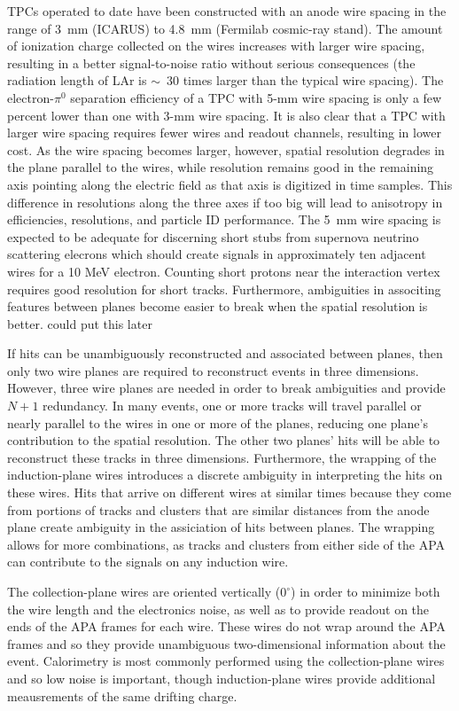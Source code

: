 TPCs operated to date have been constructed with an anode wire spacing
in the range of 3~mm (ICARUS) to 4.8~mm (Fermilab cosmic-ray
stand). The amount of ionization charge collected on the wires
increases with larger wire spacing, resulting in a better
signal-to-noise ratio without serious consequences (the radiation
length of LAr is $\sim$~30 times larger than the typical wire
spacing). The electron-$\pi^0$ separation efficiency of a TPC with
5-mm wire spacing is only a few percent lower than one with 3-mm wire
spacing. It is also clear that a TPC with larger wire spacing requires
fewer wires and readout channels, resulting in lower cost.  As the
wire spacing becomes larger, however, spatial resolution degrades in
the plane parallel to the wires, while resolution remains good in the
remaining axis pointing along the electric field as that axis is
digitized in time samples.  This difference in resolutions along the
three axes if too big will lead to anisotropy in efficiencies,
resolutions, and particle ID performance.  The 5~mm wire spacing is
expected to be adequate for discerning short stubs from supernova
neutrino scattering elecrons which should create signals in
approximately ten adjacent wires for a 10 MeV electron.  Counting
short protons near the interaction vertex requires good resolution for
short tracks.  Furthermore, ambiguities in associting features between
planes become easier to break when the spatial resolution is better.%
could put this later

If hits can be unambiguously reconstructed and associated between
planes, then only two wire planes are required to reconstruct events
in three dimensions.  However, three wire planes are needed in order
to break ambiguities and provide $N+1$ redundancy.  In many events,
one or more tracks will travel parallel or nearly parallel to the
wires in one or more of the planes, reducing one plane's contribution
to the spatial resolution.  The other two planes' hits will be able to
reconstruct these tracks in three dimensions.  Furthermore, the
wrapping of the induction-plane wires introduces a discrete ambiguity
in interpreting the hits on these wires.  Hits that arrive on
different wires at similar times because they come from portions of
tracks and clusters that are similar distances from the anode plane
create ambiguity in the assiciation of hits between planes.  The
wrapping allows for more combinations, as tracks and clusters from
either side of the APA can contribute to the signals on any induction
wire.

The collection-plane wires are oriented vertically ($0^\circ$) in
order to minimize both the wire length and the electronics noise,
as well as to provide readout on the ends of the APA frames for
each wire.  These wires do not wrap around the APA frames and so
they provide unambiguous two-dimensional information about the
event.  Calorimetry is most commonly performed using the
collection-plane wires and so low noise is important, though
induction-plane wires provide additional meausrements of the same
drifting charge.

